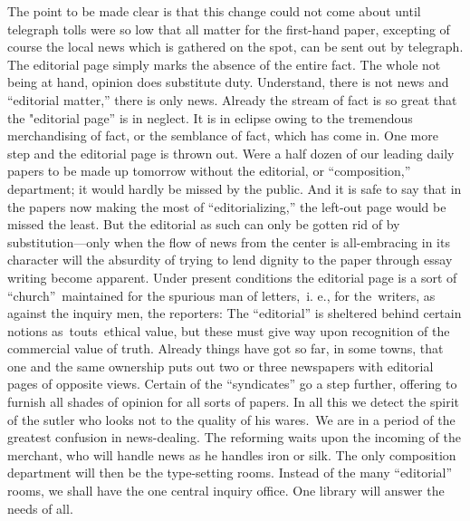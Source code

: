 \documentclass[openany,nobib]{tufte-book}
\begin{document}
The point to be made clear is that this change could not come about
until telegraph tolls were so low that all matter for the first-hand
paper, excepting of course the local news which is gathered on the spot,
can be sent out by telegraph. The editorial page simply marks the
absence of the entire fact. The whole not being at hand, opinion does
substitute duty. Understand, there is not news and ``editorial matter,''
there is only news. Already the stream of fact is so great that the
"editorial page'' is in neglect. It is in eclipse owing to the
tremendous merchandising of fact, or the semblance of fact, which has
come in. One more step and the editorial page is thrown out. Were a half
dozen of our leading daily papers to be made up tomorrow without the
editorial, or ``composition,'' department; it would hardly be missed by
the public. And it is safe to say that in the papers now making the most
of ``editorializing,'' the left-out page would be missed the least. But
the editorial as such can only be gotten rid of by substitution---only
when the flow of news from the center is all-embracing in its character
will the absurdity of trying to lend dignity to the paper through essay
writing become apparent. Under present conditions the editorial page is
a sort of ``church''~maintained for the spurious man of letters,~i. e.,
for the~writers, as against the inquiry men, the reporters: The
``editorial'' is sheltered behind certain notions as~touts~ethical
value, but these must give way upon recognition of the commercial value
of truth. Already things have got so far, in some towns, that one and
the same ownership puts out two or three newspapers with editorial pages
of opposite views. Certain of the ``syndicates'' go a step further,
offering to furnish all shades of opinion for all sorts of papers. In
all this we detect the spirit of the sutler who looks not to the quality
of his wares.~We are in a period of the greatest confusion in
news-dealing. The reforming waits upon the incoming of the merchant, who
will handle news as he handles iron or silk. The only composition
department will then be the type-setting rooms. Instead of the many
``editorial'' rooms, we shall have the one central inquiry office. One
library will answer the needs of all.~
\end{document}
